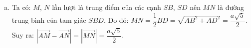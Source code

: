 \begin{ex}
{\begin{enumerate}[a)]
	 Ta tính được: $\cos \widehat{MAB}=\dfrac{MA^2+AB^2-MB^2}{2MA \cdot AB}=\dfrac{\sqrt{5}}{5}$.\\
	 Mà: $\left(\vec{AM},\vec{AB}\right)=\widehat{MAB}$, suy ra: \\
	 $\vec{AM}\cdot \vec{AB}=\left| \vec{AM} \right| \cdot \left| \vec{AB} \right| \cdot \cos \left(\vec{AM},\vec{AB}\right)=\dfrac{a\sqrt{5}}{2} \cdot a \cdot \dfrac{\sqrt{5}}{5}=\dfrac{a^2}{2}$.
	\item Ta có: $M$, $N$ lần lượt là trung điểm của các cạnh $SB$, $SD$ nên $MN$ là đường trung bình của tam giác $SBD$.
	 Do đó: $MN=\dfrac{1}{2}BD=\sqrt{AB^2+AD^2}=\dfrac{a\sqrt{5}}{2}$.\\
	 Suy ra: $\left| \vec{AM}-\vec{AN} \right| =\left| \vec{MN} \right| =\dfrac{a\sqrt{5}}{2}$.
	\end{enumerate}
	}
\end{ex}
